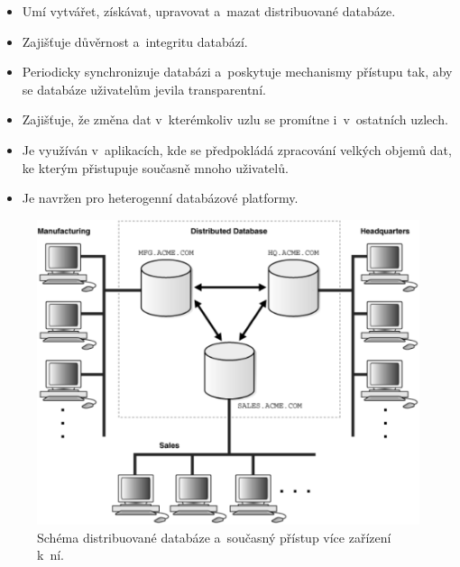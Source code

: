\begin{itemize}
\item Umí vytvářet, získávat, upravovat a~mazat distribuované databáze.

\item Zajišťuje důvěrnost a~integritu databází.

\item Periodicky synchronizuje databázi a~poskytuje mechanismy přístupu tak, aby se databáze uživatelům jevila transparentní.

\item Zajišťuje, že změna dat v~kterémkoliv uzlu se promítne i~v~ostatních uzlech.

\item Je využíván v~aplikacích, kde se předpokládá zpracování velkých objemů dat, ke kterým přistupuje současně mnoho uživatelů.

\item Je navržen pro heterogenní databázové platformy.
\end{itemize}

\begin{figure}[!h]
  \centering
  \includegraphics[width=13cm]{template-fig/Distributed_database.pdf}
  \caption{Schéma distribuované databáze a~současný přístup více zařízení k~ní. \cite{distributedDBMSPic}}
  \label{FIG_DistrDB}
\end{figure}

